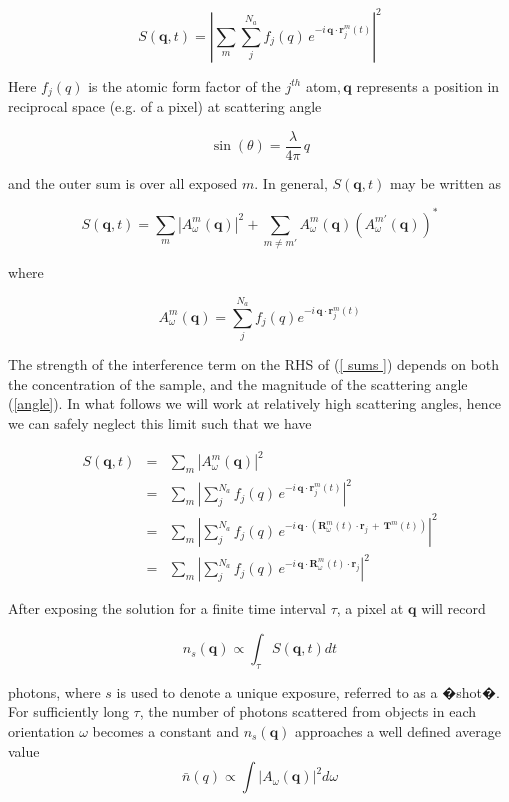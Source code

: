 \documentclass [11pt,fleqn]{article}
\def \be {\begin{equation}}
\def \ee {\end{equation}}
\def \beq {\begin{eqnarray}}
\def \eeq {\end{eqnarray}}
\begin{document}
\be
S(\bm q, t) = \left | \sum_m \sum_{j}^{N_a} f_j(q) \,e ^ { -i \,\bm q \cdot \bm  r^m _j (t)  } \right |^2
\ee

Here $f_j( q  )$ is the atomic form factor of the $j^{th}$ atom$, \bm q$ represents a position in reciprocal space (e.g. of a pixel) at scattering angle  

\be \label{angle}
\sin(\theta) = \frac{ \lambda }{ 4 \pi}\,q
\ee

and the outer sum is over all exposed $m$. In general, $S(\bm q, t)$ may be written as

\be \label{ sums }
S( \bm q, t) = \sum_m \left | A^m_\omega (\bm q ) \right|^2 + \sum _{ m \neq m' } A^m_\omega (\bm q) \left (A^{m'}_\omega (\bm q) \right )^*
\ee

where 

\be
A^m_\omega (\bm q) = \sum_{j}^{N_a} f_j(q) e^{ -i \,\bm q \cdot \bm  r^m_j (t)  }
\ee

The strength of the interference term on the RHS of (\ref{ sums }) depends on both the concentration of the sample, and the magnitude of the scattering angle (\ref{angle}). In what follows we will work at relatively high scattering angles, hence we can safely neglect this limit such that we have

\beq \label{ scatter}
S( \bm q, t) &=& \sum_m \left | A^m_\omega (\bm q) \right|^2 \\
&=& \sum_m \left | \sum_{j}^{N_a} f_j(q)\, e^ { -i \,\bm q \cdot \bm  r^m _j (t)} \right | ^2   \\
&=& \sum_m \left | \sum_{j}^{N_a} f_j(q)\, e^ { -i \,\bm q \cdot \left (\bm {R}^m_\omega \left(t\right)\cdot \bm r_j \,+\, \bm {T}^m\left(t\right) \right)} \right | ^2 \\
&=& \sum_m \left | \sum_{j}^{N_a} f_j(q)\, e^ { -i \,\bm q \cdot \bm {R}^m_\omega (t)\cdot \bm r_j }  \right | ^2 
\eeq

After exposing the solution for a finite time interval $\tau$, a pixel at $\bm q$ will record 

\be
n_s( \bm q ) \propto \int_{\tau} S( \bm q, t ) dt
\ee

photons, where $s$ is used to denote a unique exposure, referred to as a �shot�. For sufficiently long $\tau$, the number of photons scattered from objects in each orientation $\omega$ becomes a constant and $n_s(\bm q)$ approaches a well defined average value
\be 
\bar n(q) \propto \int \left | A_\omega (\bm q) \right | ^2 d\omega
\ee
\end{document}
